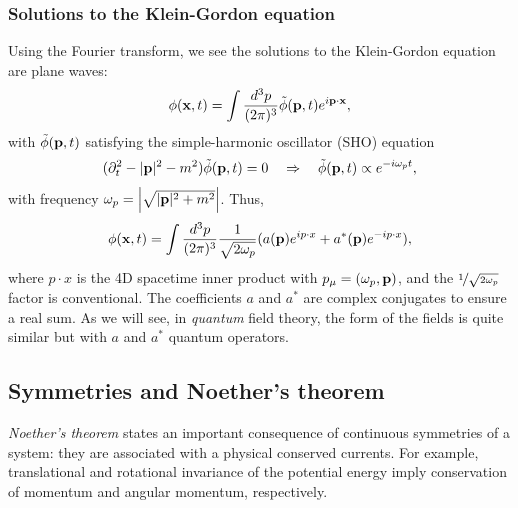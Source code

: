 \subsubsection{Solutions to the Klein-Gordon equation}

Using the Fourier transform, we see the solutions to the Klein-Gordon equation are plane waves:
\begin{equation}
	\label{eq:01_qft_field_kg_solutions}
	\phi(\mathbf{x}, t) = \int \frac{d^3p}{(2\pi)^3} \tilde \phi(\mathbf{p}, t) e^{i\mathbf{p}\cdot\mathbf{x}},
\end{equation}
with $\tilde \phi(\mathbf{p}, t)$ satisfying the simple-harmonic oscillator (SHO) equation
\begin{equation}
	\label{eq:01_qft_field_kg_sho}
	(\partial_t^2 - |\mathbf{p}|^2 - m^2)\tilde \phi(\mathbf{p}, t) = 0 \quad \Rightarrow \quad \tilde \phi(\mathbf{p}, t) \propto e^{-i\omega_p t},
\end{equation}
with frequency $\omega_p = \left\lvert \sqrt{|\mathbf{p}|^2 + m^2} \right\rvert$.
Thus,
\begin{equation}
	\label{eq:01_qft_field_kg_solutions_final}
	\phi(\mathbf{x}, t) = \int \frac{d^3p}{(2\pi)^3} \frac{1}{\sqrt{2\omega_p}} (a(\mathbf{p})e^{ip\cdot x} + a^*(\mathbf{p})e^{-ip\cdot x}),
\end{equation}
where $p\cdot x$ is the 4D spacetime inner product with $p_\mu = (\omega_p, \mathbf{p})$, and the $\cnicefrac{1}{\sqrt{2\omega_p}}$ factor is conventional.
The coefficients $a$ and $a^*$ are complex conjugates to ensure a real sum.
As we will see, in \textit{quantum} field theory, the form of the fields is quite similar but with $a$ and $a^*$ quantum operators.

\subsection{Symmetries and Noether's theorem}
\label{sec:01_qft_classical_symmetries}

\textit{Noether's theorem} states an important consequence of continuous symmetries of a system: they are associated with a physical conserved currents.
For example, translational and rotational invariance of the potential energy imply conservation of momentum and angular momentum, respectively.

